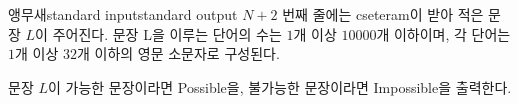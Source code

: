 \begin{problem}{앵무새}{standard input}{standard output}
$N+2$ 번째 줄에는 cseteram이 받아 적은 문장 $L$이 주어진다. 문장 L을 이루는 단어의 수는 $1$개 이상 $10000$개 이하이며, 각 단어는 $1$개 이상 $32$개 이하의 영문 소문자로 구성된다.

\OutputFile
문장 $L$이 가능한 문장이라면 Possible을, 불가능한 문장이라면 Impossible을 출력한다.

\Example

\begin{example}
%
%
%
\end{example}

\end{problem}
